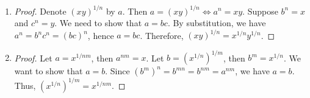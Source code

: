 \documentclass[12pt, letter]{article}
\begin{document}
\begin{enumerate}[label=(\alph*)]
\begin{proof}
\begin{equation*}
            \begin{gathered}
                y_2^{k_2}=y_1^{k_1}\leq y_1^{k_2+1}=y_1^{k_2}\cdot y_1,\\
            \Bigl(\frac{y_2}{y_1}\Bigr)^{k_2}\leq y_1<1.
            \end{gathered}
         \end{equation*} 
         Therefore, 
         \begin{equation*}
            \frac{y_2}{y_1}<1\implies y_1>y_2.
         \end{equation*}
         Thus, $x^{1/k}$ is an increasing function of $k$ when $x>1$. \\
         If $x=1$. we have $y^n=1$ so $y=1$. Therefore, $x^{1/n}=y=1$.
    \end{proof}
    \item \begin{proof}
        Denote $(xy)^{1/n}$ by $a$. Then $a=(xy)^{1/n}\iff a^n=xy$. Suppose $b^n=x$ and $c^n=y$. We need to show that $a=bc$. By substitution, we have $a^n=b^n c^n=(bc)^n$, hence $a=bc$. Therefore, $(xy)^{1/n}=x^{1/n}y^{1/n}$.
    \end{proof}
    \item \begin{proof}
        Let $a=x^{1/nm}$, then $a^{nm}=x$. Let $b=(x^{1/n})^{1/m}$, then $b^m=x^{1/n}$. We want to show that $a=b$. Since $(b^m)^n=b^{mn}=b^{nm}=a^{nm}$, we have $a=b$. Thus, $(x^{1/n})^{1/m}=x^{1/nm}$. 
    \end{proof}
\end{enumerate}
\end{document}
